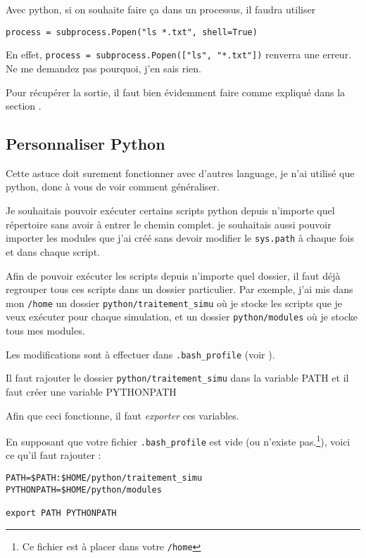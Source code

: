 \documentclass[a4paper,twoside]{article}
\begin{document}
Avec python, si on souhaite faire ça dans un processus, il faudra utiliser
\begin{verbatim}
process = subprocess.Popen("ls *.txt", shell=True)
\end{verbatim}

En effet, \verb|process = subprocess.Popen(["ls", "*.txt"])| renverra une erreur. Ne me demandez pas pourquoi, j'en sais rien.

\begin{remarque}
Pour récupérer la sortie, il faut bien évidemment faire comme expliqué dans la section .
\end{remarque}

\subsection{Personnaliser Python}
Cette astuce doit surement fonctionner avec d'autres language, je  n'ai utilisé que python, donc à vous de voir comment généraliser.

Je souhaitais pouvoir exécuter certains scripts python depuis  n'importe quel répertoire sans avoir à entrer le chemin complet. je  souhaitais aussi pouvoir importer les modules que j'ai créé sans  devoir modifier le \texttt{sys.path} à chaque fois et dans chaque  script.

Afin de pouvoir exécuter les scripts depuis n'importe quel dossier,  il faut déjà regrouper tous ces scripts dans un dossier particulier.  Par exemple, j'ai mis dans mon \texttt{/home} un dossier \texttt {python/traitement\_simu} où je stocke les scripts que je veux  exécuter pour chaque simulation, et un dossier \texttt{python/modules} où je stocke tous mes modules.

Les modifications sont à effectuer dans \texttt{.bash\_profile} (voir  ).

Il faut rajouter le dossier \texttt{python/traitement\_simu} dans la  variable PATH et il faut créer une variable PYTHONPATH

\begin{attention}
Afin que ceci fonctionne, il faut \emph{exporter} ces variables.
\end{attention}

En supposant que votre fichier \texttt{.bash\_profile} est vide (ou  n'existe pas.\footnote{Ce fichier est à placer dans votre \texttt{/home}}), voici ce qu'il faut rajouter :
\begin{verbatim}
PATH=$PATH:$HOME/python/traitement_simu
PYTHONPATH=$HOME/python/modules

export PATH PYTHONPATH
\end{verbatim}


\printindex
\end{document}
